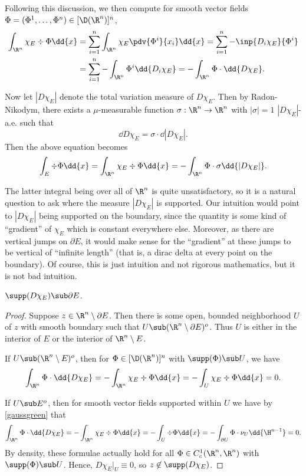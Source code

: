 \documentclass[../main.tex]{subfiles}
\begin{document}
Following this discussion, we then compute for smooth vector fields $ \Phi = ( \Phi^{1}, \ldots, \Phi^{n})\in [\D(\R^{n})]^{n} $,
\begin{align*}
    \int_{\R^{n}} \chi_{E}\div{\Phi} \dd{x} &= \sum_{i=1}^{n}\int_{\R^{n}} \chi_{E} \pdv{\Phi^{i}}{x_{i}} \dd{x} = \sum_{i=1}^{n} -\inp{D_{i} \chi_{E}}{\Phi^{i}} \\
    &= \sum_{i=1}^{n} -\int_{\R^{n}} \Phi^{i} \dd{D_{i} \chi_{E}}= - \int_{\R^{n}} \Phi\cdot \dd{D \chi_{E}}.
\end{align*}

Now let $ |D \chi_{E}| $ denote the total variation measure of $ D \chi_{E} $. Then by Radon-Nikodym, there exists a $ \mu $-measurable function $ \sigma:\R^{n}\to \R^{n} $ with $ | \sigma | = 1 $ $ |D \chi_{E}| $-a.e. such that 
\[
    \dd{D \chi_{E}} = \sigma\cdot \dd{|D \chi_{E}|}.
\]
Then the above equation becomes
\[
    \int_{E} \div{\Phi} \dd{x} = \int_{\R^{n}} \chi_{E} \div{\Phi} \dd{x} = -\int_{\R^{n}} \Phi\cdot \sigma \dd{|D \chi_{E}|}.
\]

The latter integral being over all of $ \R^{n} $ is quite unsatisfactory, so it is a natural question to ask where the measure  $ |D \chi_{E}| $ is supported. Our intuition would point to $ |D \chi_{E}| $ being supported on the boundary, since the quantity is some kind of ``gradient'' of $ \chi_{E} $ which is constant everywhere else. Moreover, as there are vertical jumps on $ \partial E $, it would make sense for the ``gradient'' at these jumps to be vertical of ``infinite length'' (that is, a dirac delta at every point on the boundary). Of course, this is just intuition and not rigorous mathematics, but it is not bad intuition.

\begin{claim}
    $ \supp(D \chi_{E}) \sub \partial E $.
\end{claim}

\begin{proof}
    Suppose $ z\in \R^{n}\setminus \partial E $. Then there is some open, bounded neighborhood $ U $ of $ z $ with smooth boundary such that $ U\sub (\R^{n}\setminus \partial E)^{o} $. Thus $ U $ is either in the interior of $ E $ or the interior of $ \R^{n}\setminus E $. 

    If $ U\sub (\R^{n}\setminus E)^{o} $, then for $ \Phi\in [\D(\R^{n})]^{n} $ with $ \supp(\Phi)\sub U $, we have
    \[ 
        \int_{\R^{n}} \Phi\cdot \dd{D \chi_{E}} = -\int_{\R^{n}}\chi_{E} \div{\Phi} \dd{x} = -\int_{U} \chi_{E}\div{\Phi}\dd{x} = 0.
    \]

    If $ U\sub E^{o} $, then for smooth vector fields supported within $ U $ we have by \eqref{gaussgreen} that
    \[
        \int_{\R^{n}} \Phi\cdot \dd{D \chi_{E}} = -\int_{\R^{n}}\chi_{E} \div{\Phi} \dd{x} = -\int_{U} \div{\Phi}\dd{x} = -\int_{\partial U} \Phi\cdot \nu_{U} \dd{\H^{n-1}} = 0.
    \]
    By density, these formulae actually hold for all $ \Phi\in C^{1}_{c} (\R^{n},\R^{n}) $ with $ \supp(\Phi)\sub U $. Hence, $ D\chi_{E}\vert_{U} \equiv 0 $, so $ z\not\in \supp(D\chi_{E}) $.
\end{proof}
\end{document}
